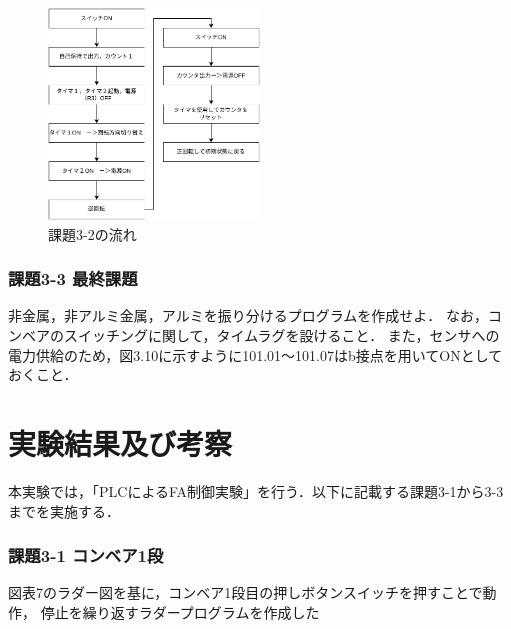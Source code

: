 \begin{figure}[H]
  \centering
  \includegraphics[width=0.5\textwidth]{sozai/12.pdf}
  \caption{課題3-2の流れ}
\end{figure}

\subsubsection*{課題3-3 最終課題}
非金属，非アルミ金属，アルミを振り分けるプログラムを作成せよ．
なお，コンベアのスイッチングに関して，タイムラグを設けること．
また，センサへの電力供給のため，図3.10に示すように101.01〜101.07はb接点を用いてONとしておくこと．

\section{実験結果及び考察}
本実験では，「PLCによるFA制御実験」を行う．以下に記載する課題3-1から3-3までを実施する．

\subsubsection*{課題3-1 コンベア1段}
図表7のラダー図を基に，コンベア1段目の押しボタンスイッチを押すことで動作，
停止を繰り返すラダープログラムを作成した

